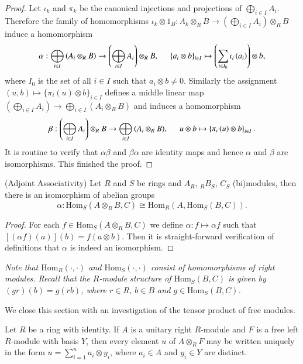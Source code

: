 \begin{proof}
Let $\iota_k$ and $\pi_k$ be the canonical injections and projections of $\bigoplus_{i\in I}A_i$. Therefore the family of homomorphisms $\iota_k\otimes 1_B:A_k\otimes_RB\to\left(\bigoplus_{i\in I}A_i\right)\otimes_RB$ induce a homomorphism 
$$
\alpha :\bigoplus_{i\in I}{\left( A_i\otimes _RB \right)}\rightarrow \left( \bigoplus_{i\in I}{A_i} \right) \otimes _RB,\hspace{0.5cm}\left\{ a_i\otimes b \right\} _{i\in I}\mapsto \left( \sum_{i\in I_0}{\iota _i\left( a_i \right)} \right) \otimes b,
$$
where $I_0$ is the set of all $i\in I$ such that $a_i\otimes b\ne 0$. Similarly the assignment $(u,b)\mapsto\{\pi_i(u)\otimes b\}_{i\in I}$ defines a middle linear map $\left(\bigoplus_{i\in I}A_i\right)\to\bigoplus_{i\in I}(A_i\otimes_RB)$ and induces a homomorphism 
$$
\beta :\left( \bigoplus_{i\in I}{A_i} \right) \otimes _RB\rightarrow \bigoplus_{i\in I}{\left( A_i\otimes _RB \right)},\hspace{0.5cm}u\otimes b\mapsto \left\{ \pi _i\left( u \right) \otimes b \right\} _{i\in I}.
$$
It is routine to verify that $\alpha\beta$ and $\beta\alpha$ are identity maps and hence $\alpha$ and $\beta$ are isomorphisms. This finished the proof.
\end{proof}
\begin{theorem}{(Adjoint Associativity)}
Let $R$ and $S$ be rings and $A_R$, $_RB_S$, $C_S$ (bi)modules, then there is an isomorphism of abelian groups 
$$
\alpha :\mathrm{Hom}_S\left( A\otimes _RB,C \right) \cong \mathrm{Hom}_R\left( A,\mathrm{Hom}_S\left( B,C \right) \right) .
$$
\end{theorem}
\begin{proof}
For each $f\in\mathrm{Hom}_S(A\otimes_RB,C)$ we define $\alpha:f\mapsto\alpha f$ such that $[(\alpha f)(a)](b)=f(a\otimes b)$. Then it is straight-forward verification of definitions that $\alpha$ is indeed an isomorphism.
\end{proof}
\begin{note}\em
Note that $\mathrm{Hom}_R(\cdot,\cdot)$ and $\mathrm{Hom}_S(\cdot,\cdot)$ consist of homomorphisms of right modules. Recall that the $R$-module structure of $\mathrm{Hom}_S(B,C)$ is given by $(gr)(b)=g(rb)$, where $r\in R$, $b\in B$ and $g\in\mathrm{Hom}_S(B,C)$.
\end{note}
We close this section with an investigation of the tensor product of free modules.
\begin{theorem}
Let $R$ be a ring with identity. If $A$ is a unitary right $R$-module and $F$ is a free left $R$-module with basis $Y$, then every element $u$ of $A\otimes_RF$ may be written uniquely in the form $u=\sum_{i=1}^na_i\otimes y_i$, where $a_i\in A$ and $y_i\in Y$ are distinct.
\end{theorem}
